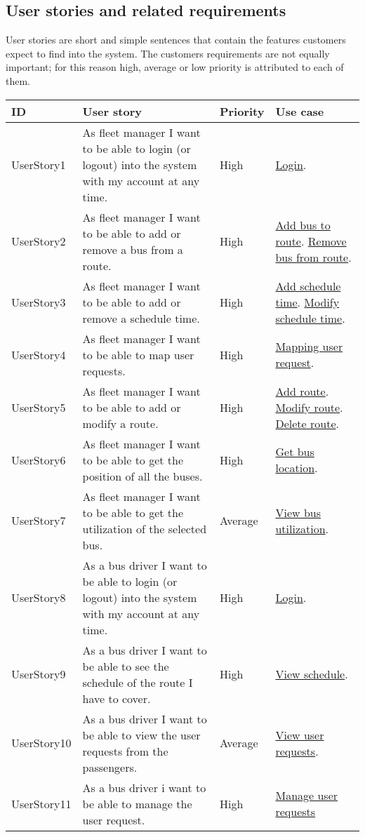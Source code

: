 \subsection{User stories and related requirements}
User stories are short and simple sentences that contain the features customers expect to find into the system. The customer\textquotesingle s requirements are not equally important; for this reason high, average or low priority is attributed to each of them.
\begin{table}[H]
	\centering
	\begin{tabular}{| m{2.2cm} | m{6cm} | m{1.5cm} | m{2.5cm} |}
		\hline
		\textbf{ID} & \textbf{User story} & \textbf{Priority} & \textbf{Use case}\\
		\hline
		UserStory1 & As fleet manager I want to be able to login (or logout) into the system with my account at any time. & High & \hyperlink{Login_fm}{Login}.\\
		\hline
		UserStory2 & As fleet manager I want to be able to add or remove a bus from a route. & High & \hyperlink{Add_bus_to_route_fm}{Add bus to route}. \hyperlink{Remove_bus_from_route_fm}{Remove bus from route}.\\
		\hline
		UserStory3 & As fleet manager I want to be able to add or remove a schedule time. & High & \hyperlink{Add_schedule_time_fm}{Add schedule time}. \hyperlink{Modify_schedule_time_fm}{Modify schedule time}.\\
		\hline
		UserStory4 & As fleet manager I want to be able to map user requests. & High & \hyperlink{Mapping_user_requests_fm}{Mapping user request}.\\
		\hline
		UserStory5 & As fleet manager I want to be able to add or modify a route. & High & \hyperlink{Add_route_fm}{Add route}. \hyperlink{Modify_route_fm}{Modify route}. \hyperlink{Delete_route_fm}{Delete route}.\\
		\hline
		UserStory6 & As fleet manager I want to be able to get the position of all the buses. & High & \hyperlink{Get_bus_location_fm}{Get bus location}.\\
		\hline
		UserStory7 & As fleet manager I want to be able to get the utilization of the selected bus. & Average & \hyperlink{View_bus_utilization_fm}{View bus utilization}.\\
		\hline
		UserStory8 & As a bus driver I want to be able to login (or logout) into the system with my account at any time. & High & \hyperlink{Login_bd}{Login}.\\
		\hline
		UserStory9 & As a bus driver I want to be able to see the schedule of the route I have to cover. & High & \hyperlink{View_schedule_bd}{View schedule}.\\
		\hline
		UserStory10 & As a bus driver I want to be able to view the user requests from the passengers. & Average & \hyperlink{View_user_requests_bd}{View user requests}.\\
		\hline
		UserStory11 & As a bus driver i want to be able to manage the user request. & High & \hyperlink{Manage_user_requests_bd}{Manage user requests}\\
		\hline
	\end{tabular}
\end{table}
